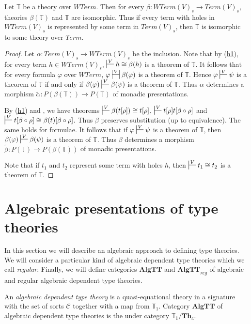 \documentclass[reqno]{amsart}
\newcommand{\axref}[1]{(\hyperref[ax:#1]{#1})}
\theoremstyle{definition}
\theoremstyle{remark}
\newcommand{\cat}[1]{\mathbf{#1}}
\newcommand{\algtt}{\cat{AlgTT}}
\numberwithin{figure}{section}
\begin{document}
\begin{prop}
Let $\mathbb{T}$ be a theory over $WTerm$.
Then for every $\beta : WTerm(V)_s \to Term(V)_s$, theories $\beta(\mathbb{T})$ and $\mathbb{T}$ are isomorphic.
Thus if every term with holes in $WTerm(V)_s$ is represented by some term in $Term(V)_s$, then $\mathbb{T}$ is isomorphic to some theory over $Term$.
\end{prop}
\begin{proof}
Let $\alpha : Term(V)_s \to WTerm(V)_s$ be the inclusion.
Note that by \axref{h1}, for every term $h \in WTerm(V)_s$, $\sststile{}{V} h \cong \beta(h)$ is a theorem of $\mathbb{T}$.
It follows that for every formula $\varphi$ over $WTerm$, $\varphi \ssststile{}{V} \beta(\varphi)$ is a theorem of $\mathbb{T}$.
Hence $\varphi \sststile{}{V} \psi$ is a theorem of $\mathbb{T}$ if and only if $\beta(\varphi) \sststile{}{V} \beta(\psi)$ is a theorem of $\mathbb{T}$.
Thus $\alpha$ determines a morphism $\widetilde{\alpha} : P(\beta(\mathbb{T})) \to P(\mathbb{T})$ of monadic presentations.

By \axref{h1} and , we have theorems $\sststile{}{V} \beta(t[\rho]) \cong t[\rho]$,
    $\sststile{}{V} t[\rho] t[\beta \circ \rho]$ and $\sststile{}{V} t[\beta \circ \rho] \cong \beta(t)[\beta \circ \rho]$.
Thus $\beta$ preserves substitution (up to equivalence).
The same holds for formulae.
It follows that if $\varphi \sststile{}{V} \psi$ is a theorem of $\mathbb{T}$, then $\beta(\varphi) \sststile{}{V} \beta(\psi)$ is a theorem of $\mathbb{T}$.
Thus $\beta$ determines a morphism $\widetilde{\beta} : P(\mathbb{T}) \to P(\beta(\mathbb{T}))$ of monadic presentations.

Note that if $t_1$ and $t_2$ represent some term with holes $h$, then $\sststile{}{V} t_1 \cong t_2$ is a theorem of $\mathbb{T}$.
\end{proof}

\section{Algebraic presentations of type theories}

In this section we will describe an algebraic approach to defining type theories.
We will consider a particular kind of algebraic dependent type theories which we call \emph{regular}.
Finally, we will define categories $\algtt$ and $\algtt_{reg}$ of algebraic and regular algebraic dependent type theories.

\begin{defn}
An \emph{algebraic dependent type theory} is a quasi-equational theory in a signature with the set of sorts $\mathcal{C}$ together with a map from $\mathbb{T}_1$.
Category $\algtt$ of algebraic dependent type theories is the under category $\mathbb{T}_1 / \cat{Th}_\mathcal{C}$.
\end{defn}
\end{document}
